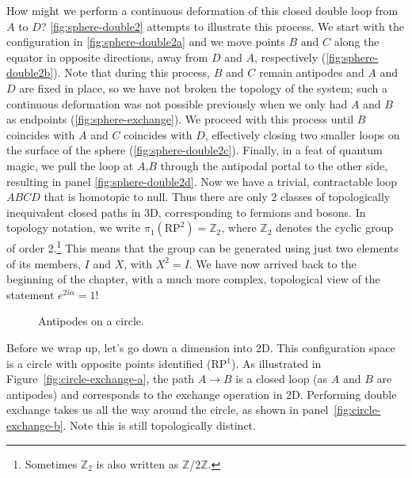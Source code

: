 \documentclass[12pt, english]{book}
\begin{document}
How might we perform a continuous deformation of this closed double loop from $A$ to $D$?
\autoref{fig:sphere-double2} attempts to illustrate this process.
We start with the configuration in \ref{fig:sphere-double2a} and we move points $B$ and $C$ along the equator in opposite directions, away from $D$ and $A$, respectively (\ref{fig:sphere-double2b}). 
Note that during this process, $B$ and $C$ remain antipodes and $A$ and $D$ are fixed in place, so we have not broken the topology of the system; such a continuous deformation was not possible previously when we only had $A$ and $B$ as endpoints (\ref{fig:sphere-exchange}).
We proceed with this process until $B$ coincides with $A$ and $C$ coincides with $D$, effectively closing two smaller loops on the surface of the sphere (\ref{fig:sphere-double2c}). 
Finally, in a feat of quantum magic, we pull the loop at $A$,$B$ through the antipodal portal to the other side, resulting in panel \ref{fig:sphere-double2d}.
Now we have a trivial, contractable loop $ABCD$ that is homotopic to null.
Thus there are only 2 classes of topologically inequivalent closed paths in 3D, corresponding to fermions and bosons.
In topology notation, we write $\pi_1(\mathrm{RP}^2) = \mathbb{Z}_2$, where $\mathbb{Z}_2$ denotes the cyclic group of order 2.\footnote{Sometimes $\mathbb{Z}_2$ is also written as $\mathbb{Z}/2\mathbb{Z}$.}
This means that the group can be generated using just two elements of its members, $I$ and $X$, with $X^2 = I$.
We have now arrived back to the beginning of the chapter, with a much more complex, topological view of the statement $e^{2i \alpha} = 1$!

\begin{figure}[!ht]
	\centering 
	 \hspace{6ex}
	\caption{Antipodes on a circle.}
	\label{fig:circle-exchange}
\end{figure}

Before we wrap up, let's go down a dimension into 2D.
This configuration space is a circle with opposite points identified (RP$^1$).
As illustrated in Figure~\ref{fig:circle-exchange-a}, the path $A \rightarrow B$ is a closed loop (as $A$ and $B$ are antipodes) and corresponds to the exchange operation in 2D.
Performing double exchange takes us all the way around the circle, as shown in panel~\ref{fig:circle-exchange-b}.
Note this is still topologically distinct.
\end{document}
